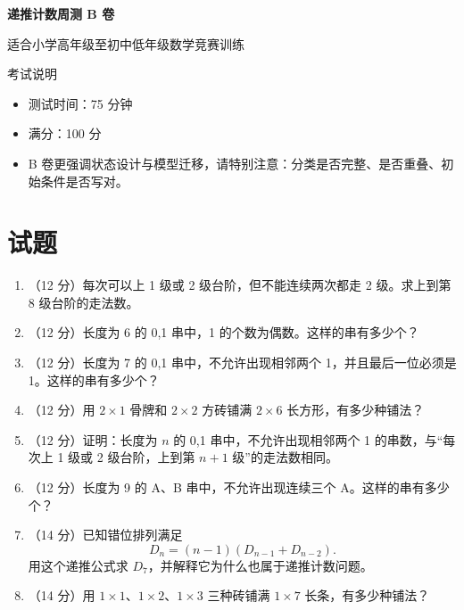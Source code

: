 \documentclass[11pt,a4paper,fontset=fandol]{ctexart}
\newcommand{\answerspace}{\vspace{2.3cm}}
\newcommand{\biganswerspace}{\vspace{3.2cm}}
\begin{document}
\thispagestyle{empty}
\begin{center}
{\fontsize{22}{28}\selectfont\bfseries 递推计数周测 B 卷\par}
\vspace{0.4cm}
{\large 适合小学高年级至初中低年级数学竞赛训练\par}
\end{center}

\begin{infobox}{考试说明}
\begin{itemize}
  \item 测试时间：75 分钟
  \item 满分：100 分
  \item B 卷更强调状态设计与模型迁移，请特别注意：分类是否完整、是否重叠、初始条件是否写对。
\end{itemize}
\end{infobox}

\section{试题}

\begin{enumerate}
  \item （12 分）每次可以上 1 级或 2 级台阶，但不能连续两次都走 2 级。求上到第 8 级台阶的走法数。
  \answerspace

  \item （12 分）长度为 6 的 0,1 串中，1 的个数为偶数。这样的串有多少个？
  \answerspace

  \item （12 分）长度为 7 的 0,1 串中，不允许出现相邻两个 1，并且最后一位必须是 1。这样的串有多少个？
  \answerspace

  \item （12 分）用 $2\times 1$ 骨牌和 $2\times 2$ 方砖铺满 $2\times 6$ 长方形，有多少种铺法？
  \biganswerspace

  \item （12 分）证明：长度为 $n$ 的 0,1 串中，不允许出现相邻两个 1 的串数，与“每次上 1 级或 2 级台阶，上到第 $n+1$ 级”的走法数相同。
  \biganswerspace

  \item （12 分）长度为 9 的 A、B 串中，不允许出现连续三个 A。这样的串有多少个？
  \answerspace

  \item （14 分）已知错位排列满足
  \[
  D_n=(n-1)(D_{n-1}+D_{n-2}).
  \]
  用这个递推公式求 $D_7$，并解释它为什么也属于递推计数问题。
  \biganswerspace

  \item （14 分）用 $1\times 1$、$1\times 2$、$1\times 3$ 三种砖铺满 $1\times 7$ 长条，有多少种铺法？
  \biganswerspace
\end{enumerate}
\end{document}
